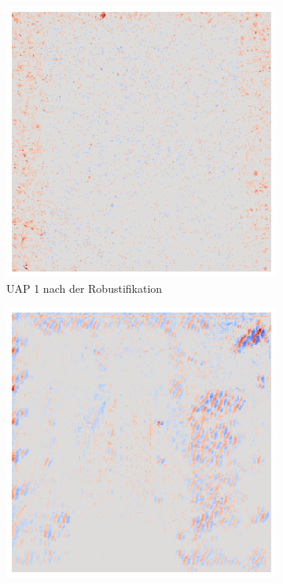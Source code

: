 \begin{figure}[ht!]
\begin{subfigure}{0.19\linewidth}
        \includegraphics[height=1\linewidth]{01-images/05-resultate/uap_resnet/uap0-resnet18-mri-n200-robustificationslevel7.png}
        \caption{UAP 1 nach der Robustifikation}
    \end{subfigure}
    \hfill%
    \begin{subfigure}{0.19\linewidth}
        \centering
        \includegraphics[height=1\linewidth]{01-images/05-resultate/uap_resnet/uap0-resnet18-covid-n200-robustificationslevel0.png}

\end{subfigure}
\end{figure}
